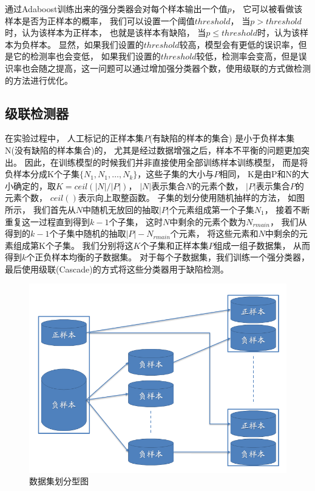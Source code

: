 通过Adaboost训练出来的强分类器会对每个样本输出一个值$p$，
它可以被看做该样本是否为正样本的概率，
我们可以设置一个阈值$threshold$，
当$p>threshold$时，认为该样本为正样本，
也就是该样本有缺陷，
当$p\leq threshold$时，认为该样本为负样本。
显然，如果我们设置的$threshold$较高，模型会有更低的误识率，但是它的检测率也会变低，
如果我们设置的$threshold$较低，检测率会变高，但是误识率也会随之提高，这一问题可以通过增加强分类器个数，使用级联的方式做检测的方法进行优化。

\subsection{级联检测器}
\label{subsection:jilianjianceqi}

在实验过程中，
人工标记的正样本集$P$(有缺陷的样本的集合)
是小于负样本集N(没有缺陷的样本集合)的，
尤其是经过数据增强之后，样本不平衡的问题更加突出。
因此，在训练模型的时候我们并非直接使用全部训练样本训练模型，
而是将负样本分成K个子集$\{N_1,N_1,\dots,N_k\}$，这些子集的大小与$P$相同，
K是由P和N的大小确定的，取$K=ceil(|N|/|P|)$，
$|N|$表示集合$N$的元素个数，
$|P|$表示集合$P$的元素个数，
$ceil()$表示向上取整函数。
子集的划分使用随机抽样的方法，
如图所示，
我们首先从$N$中随机无放回的抽取$|P|$个元素组成第一个子集$N_1$，
接着不断重复这一过程直到得到$k-1$个子集，
这时$N$中剩余的元素个数为$N_{rmain}$，
我们从得到的$k-1$个子集中随机的抽取$|P|-N_{rmain}$个元素，
将这些元素和$N$中剩余的元素组成第K个子集。
我们分别将这$K$个子集和正样本集$P$组成一组子数据集，
从而得到$k$个正负样本均衡的子数据集。
对于每个子数据集，我们训练一个强分类器，
最后使用级联\cite{viola2001rapid}(Cascade)的方式将这些分类器用于缺陷检测。
\begin{figure}[htbp]
\centering
\includegraphics[width=0.8\linewidth]{figures/db.png}
\caption{数据集划分型图}
\label{fig:cascade}
\end{figure}

